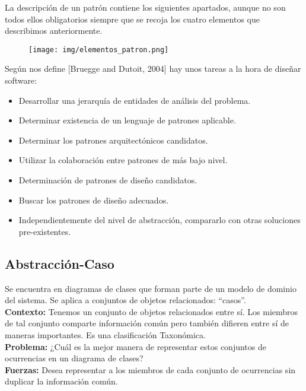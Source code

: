 \documentclass[10pt,a4paper,titlepage]{article}
\begin{document}
La descripción de un patrón contiene los siguientes apartados, aunque no son todos ellos obligatorios siempre que se recoja los cuatro elementos que describimos anteriormente.\\
\begin{figure}[H] %
\centering
\texttt{[image: img/elementos\_patron.png]}
\end{figure}

Según nos define [Bruegge and Dutoit, 2004] hay unos tareas a la hora de diseñar software:
\begin{itemize}
\item Desarrollar una jerarquía de entidades de análisis del problema.
\item Determinar existencia de un lenguaje de patrones aplicable.
\item Determinar los patrones arquitectónicos candidatos.
\item Utilizar la colaboración entre patrones de más bajo nivel.
\item Determinación de patrones de diseño candidatos.
\item Buscar los patrones de diseño adecuados.
\item Independientemente del nivel de abstracción, compararlo con otras soluciones pre-existentes.
\end{itemize}

\subsection{Abstracción-Caso}\label{Abstraccion_caso}
Se encuentra en diagramas de clases que forman parte de un modelo de dominio del sistema. Se aplica a conjuntos de objetos relacionados: ``casos''. \\

\textbf{Contexto:} Tenemos un conjunto de objetos relacionados entre sí. Los miembros de tal conjunto comparte información común pero también difieren entre sí de maneras importantes. Es una clasificación Taxonómica.\\

\textbf{Problema:} ¿Cuál es la mejor manera de representar estos conjuntos de ocurrencias en un diagrama de clases?\\

\textbf{Fuerzas:} Desea representar a los miembros de cada conjunto de ocurrencias sin duplicar la información común.\\
\end{document}
